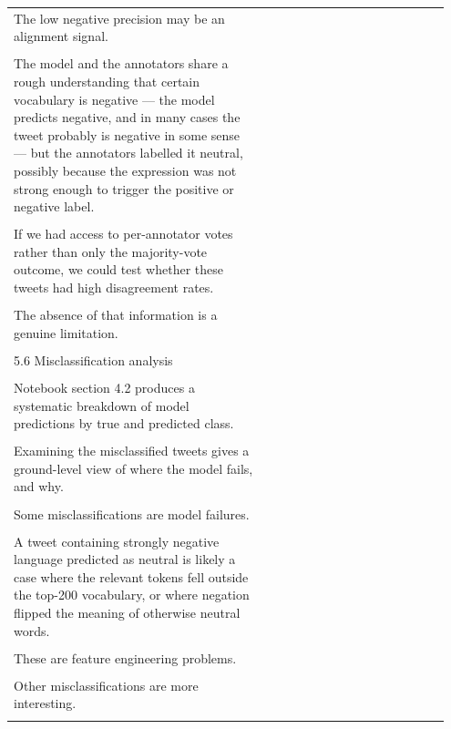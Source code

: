 \documentclass[11pt]{article}
\begin{document}
\begin{longtable}{|p{0.55\linewidth}|p{0.40\linewidth}|}
\hline
\rule{0pt}{3.5cm} & \\
\hline
The low negative precision may be an alignment signal. & \\[2pt]
\hline
\rule{0pt}{3.5cm} & \\
\hline
The model and the annotators share a rough understanding that certain vocabulary is negative --- the model predicts negative, and in many cases the tweet probably is negative in some sense --- but the annotators labelled it neutral, possibly because the expression was not strong enough to trigger the positive or negative label. & \\[2pt]
\hline
\rule{0pt}{3.5cm} & \\
\hline
If we had access to per-annotator votes rather than only the majority-vote outcome, we could test whether these tweets had high disagreement rates. & \\[2pt]
\hline
\rule{0pt}{3.5cm} & \\
\hline
The absence of that information is a genuine limitation. & \\[2pt]
\hline
\rule{0pt}{3.5cm} & \\
\hline
5.6 Misclassification analysis & \\[2pt]
\hline
\rule{0pt}{3.5cm} & \\
\hline
Notebook section 4.2 produces a systematic breakdown of model predictions by true and predicted class. & \\[2pt]
\hline
\rule{0pt}{3.5cm} & \\
\hline
Examining the misclassified tweets gives a ground-level view of where the model fails, and why. & \\[2pt]
\hline
\rule{0pt}{3.5cm} & \\
\hline
Some misclassifications are model failures. & \\[2pt]
\hline
\rule{0pt}{3.5cm} & \\
\hline
A tweet containing strongly negative language predicted as neutral is likely a case where the relevant tokens fell outside the top-200 vocabulary, or where negation flipped the meaning of otherwise neutral words. & \\[2pt]
\hline
\rule{0pt}{3.5cm} & \\
\hline
These are feature engineering problems. & \\[2pt]
\hline
\rule{0pt}{3.5cm} & \\
\hline
Other misclassifications are more interesting. & \\[2pt]
\hline
\rule{0pt}{3.5cm} & \\

\end{longtable}
\end{document}
